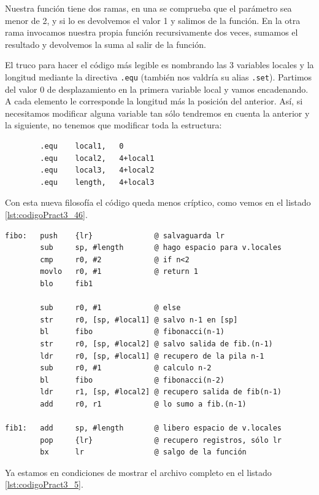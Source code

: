 Nuestra función tiene dos ramas, en una se comprueba que el parámetro sea menor de 2, y si lo
es devolvemos el valor 1 y salimos de la función. En la otra rama invocamos nuestra propia
función recursivamente dos veces, sumamos el resultado y devolvemos la suma al salir de la
función.

El truco para hacer el código más legible es nombrando las 3 variables locales y la longitud
mediante la directiva {\tt .equ} (también nos valdría su alias {\tt .set}). Partimos del valor
0 de desplazamiento en la primera variable local y vamos encadenando. A cada elemento le
corresponde la longitud más la posición del anterior. Así, si necesitamos modificar alguna
variable tan sólo tendremos en cuenta la anterior y la siguiente, no tenemos que modificar
toda la estructura:

\begin{lstlisting}
        .equ    local1,   0
        .equ    local2,   4+local1
        .equ    local3,   4+local2
        .equ    length,   4+local3
\end{lstlisting}

Con esta nueva filosofía el código queda menos críptico, como vemos en el listado \ref{lst:codigoPract3_46}.

\begin{lstlisting}[caption={Función recursiva fibo (en subrut3.s)},label={lst:codigoPract3_46}]
fibo:   push    {lr}              @ salvaguarda lr
        sub     sp, #length       @ hago espacio para v.locales
        cmp     r0, #2            @ if n<2
        movlo   r0, #1            @ return 1
        blo     fib1

        sub     r0, #1            @ else
        str     r0, [sp, #local1] @ salvo n-1 en [sp]
        bl      fibo              @ fibonacci(n-1)
        str     r0, [sp, #local2] @ salvo salida de fib.(n-1)
        ldr     r0, [sp, #local1] @ recupero de la pila n-1
        sub     r0, #1            @ calculo n-2
        bl      fibo              @ fibonacci(n-2)
        ldr     r1, [sp, #local2] @ recupero salida de fib(n-1)
        add     r0, r1            @ lo sumo a fib.(n-1)

fib1:   add     sp, #length       @ libero espacio de v.locales
        pop     {lr}              @ recupero registros, sólo lr
        bx      lr                @ salgo de la función
\end{lstlisting}

Ya estamos en condiciones de mostrar el archivo completo en el listado \ref{lst:codigoPract3_5}.

